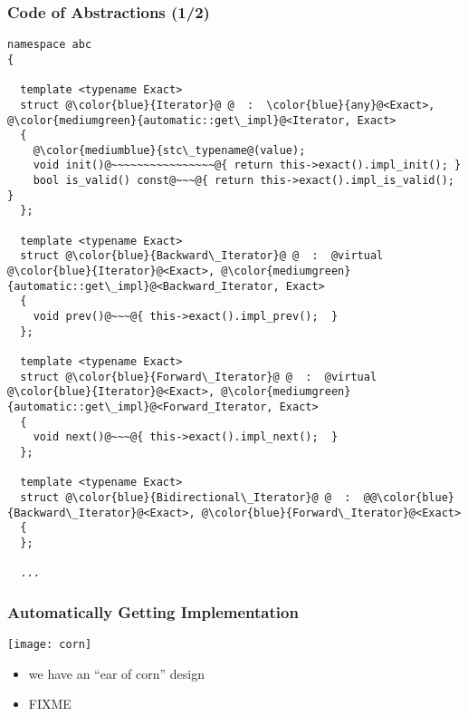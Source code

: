 \begin{frame}[fragile]
  \frametitle{Code of Abstractions (1/2)}

\begin{lstlisting}[escapechar=@,basicstyle={\tiny\sffamily}]
namespace abc
{

  template <typename Exact>
  struct @\color{blue}{Iterator}@ @  :  \color{blue}{any}@<Exact>, @\color{mediumgreen}{automatic::get\_impl}@<Iterator, Exact>
  {
    @\color{mediumblue}{stc\_typename@(value);
    void init()@~~~~~~~~~~~~~~~~@{ return this->exact().impl_init(); }
    bool is_valid() const@~~~@{ return this->exact().impl_is_valid(); }
  };

  template <typename Exact>
  struct @\color{blue}{Backward\_Iterator}@ @  :  @virtual @\color{blue}{Iterator}@<Exact>, @\color{mediumgreen}{automatic::get\_impl}@<Backward_Iterator, Exact>
  {
    void prev()@~~~@{ this->exact().impl_prev();  }
  };

  template <typename Exact>
  struct @\color{blue}{Forward\_Iterator}@ @  :  @virtual @\color{blue}{Iterator}@<Exact>, @\color{mediumgreen}{automatic::get\_impl}@<Forward_Iterator, Exact>
  {
    void next()@~~~@{ this->exact().impl_next();  }
  };

  template <typename Exact>
  struct @\color{blue}{Bidirectional\_Iterator}@ @  :  @@\color{blue}{Backward\_Iterator}@<Exact>, @\color{blue}{Forward\_Iterator}@<Exact>
  {
  };

  ...
\end{lstlisting}

\end{frame}



\begin{frame}
  \frametitle{Automatically Getting Implementation}

\begin{multicols}{2}
%
\vspace*{-9mm}\hspace*{-5mm}
\texttt{[image: corn]}
%
\columnbreak
%
\begin{itemize}
\small
\item we have an ``ear of corn'' design
\item FIXME
\end{itemize}
%
\end{multicols}

\end{frame}



